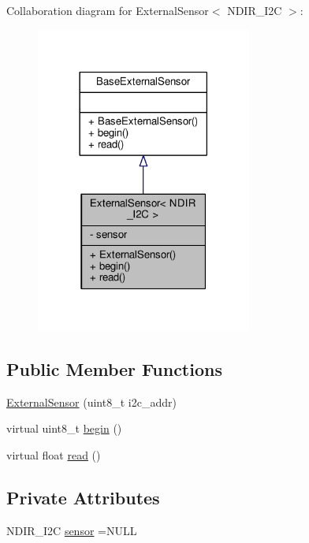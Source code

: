 Collaboration diagram for External\+Sensor$<$ N\+D\+I\+R\+\_\+\+I2C $>$\+:\nopagebreak
\begin{figure}[H]
\begin{center}
\leavevmode
\includegraphics[width=201pt]{classExternalSensor_3_01NDIR__I2C_01_4__coll__graph}
\end{center}
\end{figure}
\subsection*{Public Member Functions}
\begin{DoxyCompactItemize}
\item 
\hyperlink{classExternalSensor_3_01NDIR__I2C_01_4_aa06970ea689679c0e1deb5360e05a0a4}{External\+Sensor} (uint8\+\_\+t i2c\+\_\+addr)
\item 
virtual uint8\+\_\+t \hyperlink{classExternalSensor_3_01NDIR__I2C_01_4_ac6f3614d94968ef0cc11b2b4d69cef03}{begin} ()
\item 
virtual float \hyperlink{classExternalSensor_3_01NDIR__I2C_01_4_a239d18652e9fb4673842ae9726edf44f}{read} ()
\end{DoxyCompactItemize}
\subsection*{Private Attributes}
\begin{DoxyCompactItemize}
\item 
N\+D\+I\+R\+\_\+\+I2C \hyperlink{classExternalSensor_3_01NDIR__I2C_01_4_ae541c9cece7c38674b70114cdb74a7dc}{sensor} =N\+U\+LL
\end{DoxyCompactItemize}


